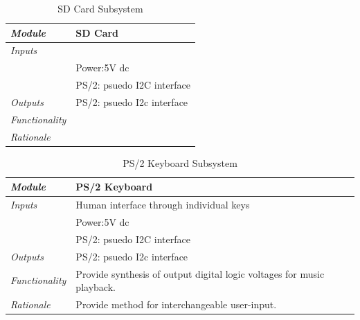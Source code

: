 \documentclass[bibtotocnumbered,abstract=on,paper=a4,fontsize=12pt,parskip=on,halfparskip=on]{scrartcl}		%
\begin{document}
      \begin{table}[H]
      \caption{SD Card Subsystem}
      \vskip 0.3cm 
      \begin{tabularx}{\linewidth}{  l X }
        \textit{Module} & SD Card\\
        \hline
        \textit{Inputs} & \\
           & Power:5V dc\\
           & PS/2: psuedo I2C interface\\
        \hline
        \textit{Outputs} & PS/2: psuedo I2c interface \\
        \hline
        \textit{Functionality} & \\
        \hline
        \textit{Rationale} & \\ 
      \end{tabularx}
      \end{table}
      \begin{table}[H]
      \caption{PS/2 Keyboard Subsystem}
      \vskip 0.3cm 
      \begin{tabularx}{\linewidth}{  l X }
        \textit{Module} & PS/2 Keyboard \\
        \hline
        \textit{Inputs} & Human interface through individual keys\\
           & Power:5V dc\\
           & PS/2: psuedo I2C interface\\
        \hline
        \textit{Outputs} & PS/2: psuedo I2c interface \\
        \hline
        \textit{Functionality} & Provide synthesis of output digital logic voltages for music playback.\\
        \hline
        \textit{Rationale} & Provide method for interchangeable user-input.\\
      \end{tabularx}
      \end{table}
\end{document}

